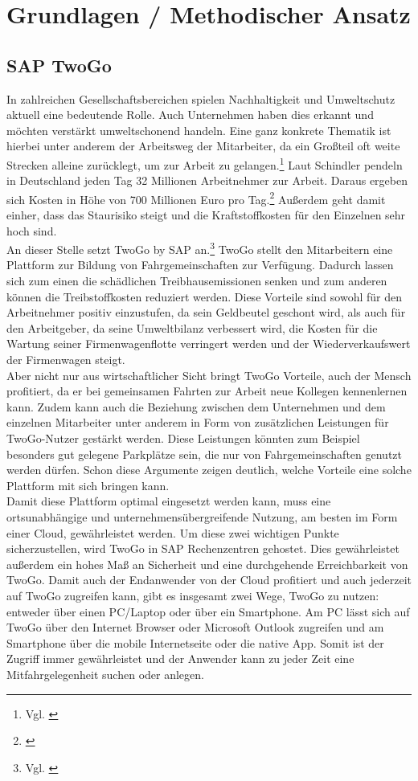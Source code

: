 
\chapter{Grundlagen / Methodischer Ansatz}


\section{SAP TwoGo}

In zahlreichen Gesellschaftsbereichen spielen Nachhaltigkeit und Umweltschutz aktuell eine bedeutende Rolle. Auch Unternehmen haben dies erkannt und möchten verstärkt umweltschonend handeln. Eine ganz konkrete Thematik ist hierbei unter anderem der Arbeitsweg der Mitarbeiter, da ein Großteil oft weite Strecken alleine zurücklegt, um zur Arbeit zu gelangen.\footnote{Vgl. \cite{SAP}} Laut Schindler pendeln in Deutschland jeden Tag 32 Millionen Arbeitnehmer zur Arbeit. Daraus ergeben sich Kosten in Höhe von 700 Millionen Euro pro Tag.\footnote{\cite{silicon}} Außerdem geht damit einher, dass das Staurisiko steigt und die Kraftstoffkosten für den Einzelnen sehr hoch sind. \\
An dieser Stelle setzt TwoGo by SAP an.\footnote{Vgl. \cite{SAP}} TwoGo stellt den Mitarbeitern eine Plattform zur Bildung von Fahrgemeinschaften zur Verfügung. Dadurch lassen sich zum einen die schädlichen Treibhausemissionen senken und zum anderen können die Treibstoffkosten reduziert werden. Diese Vorteile sind sowohl für den Arbeitnehmer positiv einzustufen, da sein Geldbeutel geschont wird, als auch für den Arbeitgeber, da seine Umweltbilanz verbessert wird, die Kosten für die Wartung seiner Firmenwagenflotte verringert werden und der Wiederverkaufswert der Firmenwagen steigt.\\
Aber nicht nur aus wirtschaftlicher Sicht bringt TwoGo Vorteile, auch der Mensch profitiert, da er bei gemeinsamen Fahrten zur Arbeit neue Kollegen kennenlernen kann. Zudem kann auch die Beziehung zwischen dem Unternehmen und dem einzelnen Mitarbeiter unter anderem in Form von zusätzlichen Leistungen für TwoGo-Nutzer gestärkt werden. Diese Leistungen könnten zum Beispiel besonders gut gelegene Parkplätze sein, die nur von Fahrgemeinschaften genutzt werden dürfen. Schon diese Argumente zeigen deutlich, welche Vorteile eine solche Plattform mit sich bringen kann.\\
Damit diese Plattform optimal eingesetzt werden kann, muss eine ortsunabhängige und unternehmensübergreifende Nutzung, am besten im Form einer Cloud, gewährleistet werden. Um diese zwei wichtigen Punkte sicherzustellen, wird TwoGo in SAP Rechenzentren gehostet. Dies gewährleistet außerdem ein hohes Maß an Sicherheit und eine durchgehende Erreichbarkeit von TwoGo. Damit auch der Endanwender von der Cloud profitiert und auch jederzeit auf TwoGo zugreifen kann, gibt es insgesamt zwei Wege, TwoGo zu nutzen: entweder über einen PC/Laptop oder über ein Smartphone. Am PC lässt sich auf TwoGo über den Internet Browser oder Microsoft Outlook zugreifen und am Smartphone über die mobile Internetseite oder die native App. Somit ist der Zugriff immer gewährleistet und der Anwender kann zu jeder Zeit eine Mitfahrgelegenheit suchen oder anlegen.
